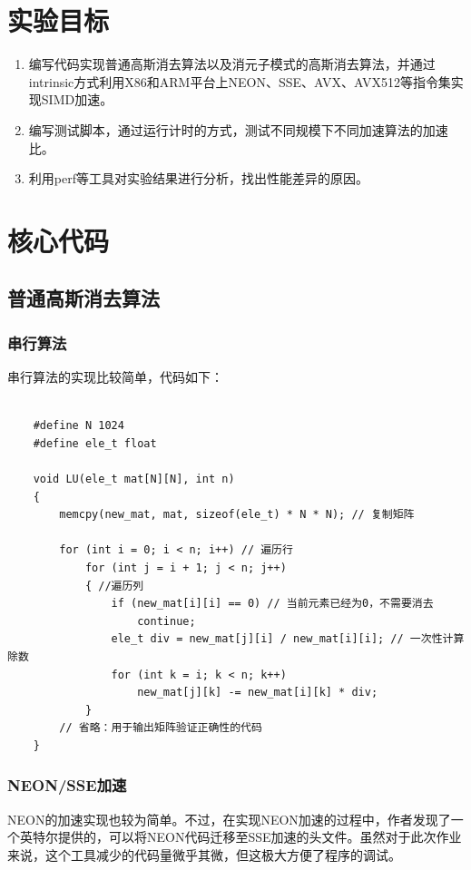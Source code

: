 \documentclass[a4paper]{article}
\begin{document}
\section{实验目标}

\begin{enumerate}
  \item 编写代码实现普通高斯消去算法以及消元子模式的高斯消去算法，并通过intrinsic方式利用X86和ARM平台上NEON、SSE、AVX、AVX512等指令集实现SIMD加速。
  \item 编写测试脚本，通过运行计时的方式，测试不同规模下不同加速算法的加速比。
  \item 利用perf等工具对实验结果进行分析，找出性能差异的原因。
\end{enumerate}

\section{核心代码}
\subsection{普通高斯消去算法}
\subsubsection{串行算法}
串行算法的实现比较简单，代码如下：
\begin{verbatim}

    #define N 1024
    #define ele_t float
    
    void LU(ele_t mat[N][N], int n)
    {
        memcpy(new_mat, mat, sizeof(ele_t) * N * N); // 复制矩阵
    
        for (int i = 0; i < n; i++) // 遍历行
            for (int j = i + 1; j < n; j++)
            { //遍历列
                if (new_mat[i][i] == 0) // 当前元素已经为0，不需要消去
                    continue;
                ele_t div = new_mat[j][i] / new_mat[i][i]; // 一次性计算除数
                for (int k = i; k < n; k++)
                    new_mat[j][k] -= new_mat[i][k] * div;
            }
        // 省略：用于输出矩阵验证正确性的代码
    }
\end{verbatim}

\subsubsection{NEON/SSE加速}
NEON的加速实现也较为简单。不过，在实现NEON加速的过程中，作者发现了一个英特尔提供的，可以将NEON代码迁移至SSE加速的头文件。\cite{intel/arm_neon_2_x86_sse_2022}虽然对于此次作业来说，这个工具减少的代码量微乎其微，但这极大方便了程序的调试。
\end{document}
